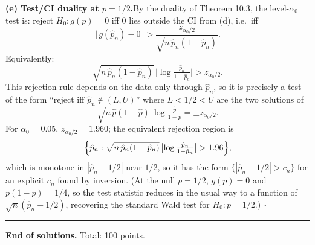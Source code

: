 \documentclass[11pt]{article}
\begin{document}
\textbf{(e) Test/CI duality at $p = 1/2$.}\quad By the duality of Theorem 10.3, the level-$\alpha_0$ test is: reject $H_0: g(p) = 0$ iff $0$ lies outside the CI from (d), i.e.\ iff
\[
\bigl|\,g(\hat p_n) - 0\,\bigr| > \frac{z_{\alpha_0/2}}{\sqrt{n\,\hat p_n(1-\hat p_n)}}.
\]
Equivalently:
\[
\sqrt{n\,\hat p_n(1-\hat p_n)}\,\bigl|\log\tfrac{\hat p_n}{1-\hat p_n}\bigr| > z_{\alpha_0/2}.
\]
This rejection rule depends on the data only through $\hat p_n$, so it is precisely a test of the form ``reject iff $\hat p_n \notin (L,U)$'' where $L < 1/2 < U$ are the two solutions of
\[
\sqrt{n\,\hat p(1-\hat p)}\,\log\tfrac{\hat p}{1-\hat p} = \pm z_{\alpha_0/2}.
\]
For $\alpha_0 = 0.05$, $z_{\alpha_0/2} = 1.960$; the equivalent rejection region is
\[
\Bigl\{\hat p_n : \sqrt{n\,\hat p_n(1-\hat p_n)}\,\bigl|\log\tfrac{\hat p_n}{1-\hat p_n}\bigr| > 1.96\Bigr\},
\]
which is monotone in $|\hat p_n - 1/2|$ near $1/2$, so it has the form $\{|\hat p_n - 1/2| > c_n\}$ for an explicit $c_n$ found by inversion. (At the null $p = 1/2$, $g(p) = 0$ and $p(1-p) = 1/4$, so the test statistic reduces in the usual way to a function of $\sqrt{n}(\hat p_n - 1/2)$, recovering the standard Wald test for $H_0: p = 1/2$.) \hfill$\square$

\bigskip
\hrule
\bigskip

\begin{center}
\textbf{End of solutions.} \quad Total: 100 points.
\end{center}
\end{document}
